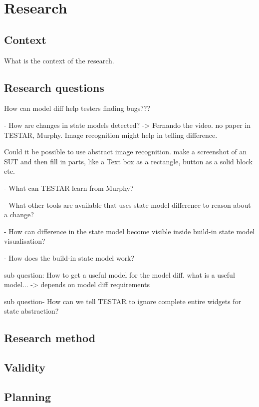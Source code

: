 \section{Research}

\subsection{Context}
What is the context of the research. 

\subsection{Research questions}

How can model diff help testers finding bugs???

- How are changes in state models detected? -> Fernando the video. no paper in TESTAR, Murphy. Image recognition might help in telling difference. 

Could it be possible to use abstract image recognition. make a screenshot of an SUT and then fill in parts, like a Text box as a rectangle, button as a solid block etc. 


- What can TESTAR learn from Murphy?

- What other tools are available that uses state model difference to reason about a change? 

- How can difference in the state model become visible inside build-in state model visualisation?

- How does the build-in state model work?

sub question: How to get a useful model for the model diff.
what is a useful model... -> depends on model diff requirements

sub question- How can we tell TESTAR to ignore complete entire widgets for state abstraction?


\subsection{Research method}

\subsection{Validity}

\subsection{Planning}